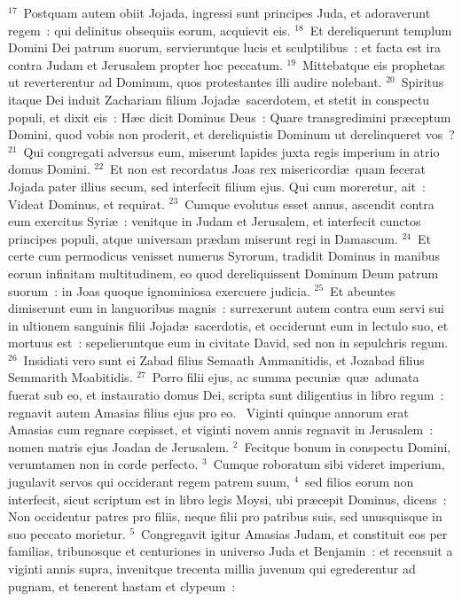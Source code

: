 ${}^{17}$~Postquam autem obiit Jojada, ingressi sunt principes Juda, et adoraverunt regem~: qui delinitus obsequiis eorum, acquievit eis.
${}^{18}$~Et dereliquerunt templum Domini Dei patrum suorum, servieruntque lucis et sculptilibus~: et facta est ira contra Judam et Jerusalem propter hoc peccatum.
${}^{19}$~Mittebatque eis prophetas ut reverterentur ad Dominum, quos protestantes illi audire nolebant.
${}^{20}$~Spiritus itaque Dei induit Zachariam filium Jojad\ae\ sacerdotem, et stetit in conspectu populi, et dixit eis~: H\ae c dicit Dominus Deus~: Quare transgredimini pr\ae ceptum Domini, quod vobis non proderit, et dereliquistis Dominum ut derelinqueret vos~?
${}^{21}$~Qui congregati adversus eum, miserunt lapides juxta regis imperium in atrio domus Domini.
${}^{22}$~Et non est recordatus Joas rex misericordi\ae\ quam fecerat Jojada pater illius secum, sed interfecit filium ejus. Qui cum moreretur, ait~: Videat Dominus, et requirat.
${}^{23}$~Cumque evolutus esset annus, ascendit contra eum exercitus Syri\ae~: venitque in Judam et Jerusalem, et interfecit cunctos principes populi, atque universam pr\ae dam miserunt regi in Damascum.
${}^{24}$~Et certe cum permodicus venisset numerus Syrorum, tradidit Dominus in manibus eorum infinitam multitudinem, eo quod dereliquissent Dominum Deum patrum suorum~: in Joas quoque ignominiosa exercuere judicia.
${}^{25}$~Et abeuntes dimiserunt eum in languoribus magnis~: surrexerunt autem contra eum servi sui in ultionem sanguinis filii Jojad\ae\ sacerdotis, et occiderunt eum in lectulo suo, et mortuus est~: sepelieruntque eum in civitate David, sed non in sepulchris regum.
${}^{26}$~Insidiati vero sunt ei Zabad filius Semaath Ammanitidis, et Jozabad filius Semmarith Moabitidis.
${}^{27}$~Porro filii ejus, ac summa pecuni\ae\ qu\ae\ adunata fuerat sub eo, et instauratio domus Dei, scripta sunt diligentius in libro regum~: regnavit autem Amasias filius ejus pro eo.
~\lettrine[lines=10,image=true,loversize=0.05,lraise=-0.03]{V}{}iginti quinque annorum erat Amasias cum regnare cœpisset, et viginti novem annis regnavit in Jerusalem~: nomen matris ejus Joadan de Jerusalem.
${}^{2}$~Fecitque bonum in conspectu Domini, verumtamen non in corde perfecto.
${}^{3}$~Cumque roboratum sibi videret imperium, jugulavit servos qui occiderant regem patrem suum,
${}^{4}$~sed filios eorum non interfecit, sicut scriptum est in libro legis Moysi, ubi pr\ae cepit Dominus, dicens~: Non occidentur patres pro filiis, neque filii pro patribus suis, sed unusquisque in suo peccato morietur.
${}^{5}$~Congregavit igitur Amasias Judam, et constituit eos per familias, tribunosque et centuriones in universo Juda et Benjamin~: et recensuit a viginti annis supra, invenitque trecenta millia juvenum qui egrederentur ad pugnam, et tenerent hastam et clypeum~:
